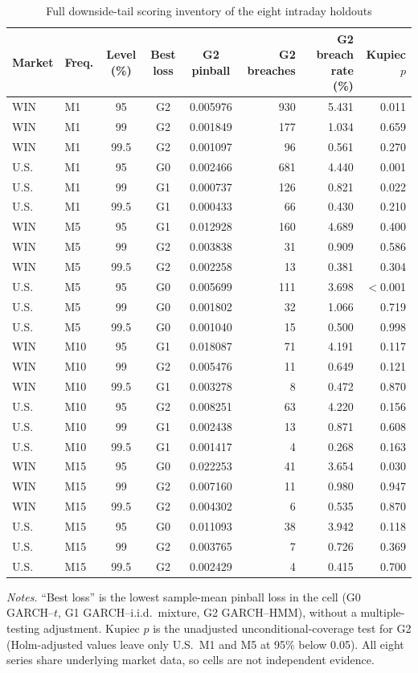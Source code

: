 \documentclass[11pt,a4paper]{article}
\theoremstyle{plain}
\theoremstyle{remark}
\begin{document}
\begin{table}[ht]
\centering\small
\caption{Full downside-tail scoring inventory of the eight intraday holdouts}\label{tab:inv}
\begin{tabular}{llcccrrr}
\toprule
Market & Freq. & Level (\%) & Best loss & G2 pinball & G2 breaches & G2 breach rate (\%) & Kupiec $p$\\
\midrule
WIN & M1 & 95 & G2 & 0.005976 & 930 & 5.431 & 0.011\\
WIN & M1 & 99 & G2 & 0.001849 & 177 & 1.034 & 0.659\\
WIN & M1 & 99.5 & G2 & 0.001097 & 96 & 0.561 & 0.270\\
U.S. & M1 & 95 & G0 & 0.002466 & 681 & 4.440 & 0.001\\
U.S. & M1 & 99 & G1 & 0.000737 & 126 & 0.821 & 0.022\\
U.S. & M1 & 99.5 & G1 & 0.000433 & 66 & 0.430 & 0.210\\
WIN & M5 & 95 & G1 & 0.012928 & 160 & 4.689 & 0.400\\
WIN & M5 & 99 & G2 & 0.003838 & 31 & 0.909 & 0.586\\
WIN & M5 & 99.5 & G2 & 0.002258 & 13 & 0.381 & 0.304\\
U.S. & M5 & 95 & G0 & 0.005699 & 111 & 3.698 & $<$0.001\\
U.S. & M5 & 99 & G0 & 0.001802 & 32 & 1.066 & 0.719\\
U.S. & M5 & 99.5 & G0 & 0.001040 & 15 & 0.500 & 0.998\\
WIN & M10 & 95 & G1 & 0.018087 & 71 & 4.191 & 0.117\\
WIN & M10 & 99 & G2 & 0.005476 & 11 & 0.649 & 0.121\\
WIN & M10 & 99.5 & G1 & 0.003278 & 8 & 0.472 & 0.870\\
U.S. & M10 & 95 & G2 & 0.008251 & 63 & 4.220 & 0.156\\
U.S. & M10 & 99 & G1 & 0.002438 & 13 & 0.871 & 0.608\\
U.S. & M10 & 99.5 & G1 & 0.001417 & 4 & 0.268 & 0.163\\
WIN & M15 & 95 & G0 & 0.022253 & 41 & 3.654 & 0.030\\
WIN & M15 & 99 & G2 & 0.007160 & 11 & 0.980 & 0.947\\
WIN & M15 & 99.5 & G2 & 0.004302 & 6 & 0.535 & 0.870\\
U.S. & M15 & 95 & G0 & 0.011093 & 38 & 3.942 & 0.118\\
U.S. & M15 & 99 & G2 & 0.003765 & 7 & 0.726 & 0.369\\
U.S. & M15 & 99.5 & G2 & 0.002429 & 4 & 0.415 & 0.700\\
\bottomrule
\end{tabular}
\par\smallskip\footnotesize\emph{Notes.} ``Best loss'' is the lowest sample-mean pinball loss in the cell (G0 GARCH--$t$, G1 GARCH--i.i.d.\ mixture, G2 GARCH--HMM), without a multiple-testing adjustment. Kupiec $p$ is the unadjusted unconditional-coverage test for G2 (Holm-adjusted values leave only U.S.\ M1 and M5 at 95\% below 0.05). All eight series share underlying market data, so cells are not independent evidence.
\end{table}
\end{document}
